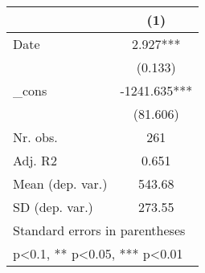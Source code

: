 {
\def\sym#1{\ifmmode^{#1}\else\(^{#1}\)\fi}
\begin{tabular}{l*{1}{c}}
\hline\hline
            &\multicolumn{1}{c}{(1)}   \\
\hline
Date        &       2.927***\\
            &     (0.133)   \\
[1em]
\_cons      &   -1241.635***\\
            &    (81.606)   \\
\hline
Nr. obs.    &         261   \\
Adj. R2     &       0.651   \\
Mean (dep. var.)&      543.68   \\
SD (dep. var.)&      273.55   \\
\hline\hline
\multicolumn{2}{l}{\footnotesize Standard errors in parentheses}\\
\multicolumn{2}{l}{\footnotesize * p<0.1, ** p<0.05, *** p<0.01}\\
\end{tabular}
}
